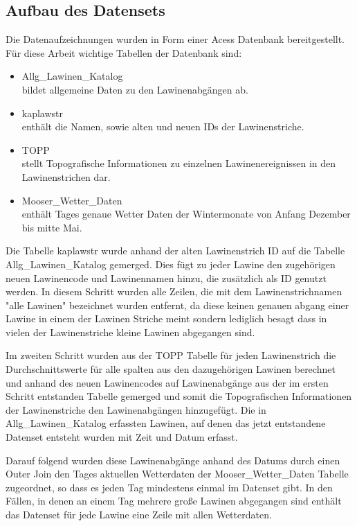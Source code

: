 \documentclass[12pt,a4paper]{article}
\begin{document}
 
\subsection{Aufbau des Datensets}
Die Datenaufzeichnungen wurden in Form einer Acess Datenbank bereitgestellt. 
Für diese Arbeit wichtige Tabellen der Datenbank sind:
\begin{itemize}
	\item Allg\_Lawinen\_Katalog \hfill \\ bildet allgemeine Daten zu den Lawinenabgängen ab.
	\item kaplawstr \hfill \\ enthält die Namen, sowie alten und neuen IDs der Lawinenstriche.
	\item TOPP \hfill \\ stellt Topografische Informationen zu einzelnen Lawinenereignissen in den Lawinenstrichen dar.
	\item Mooser\_Wetter\_Daten \hfill \\ enthält Tages genaue Wetter Daten der Wintermonate von Anfang Dezember bis mitte Mai.
\end{itemize}
	


Die Tabelle kaplawstr wurde anhand der alten Lawinenstrich ID auf die Tabelle Allg\_Lawinen\_Katalog gemerged. Dies fügt zu jeder Lawine den zugehörigen neuen Lawinencode und Lawinennamen hinzu, die zusätzlich als ID genutzt werden. In diesem Schritt wurden alle Zeilen, die mit dem Lawinenstrichnamen "alle Lawinen" bezeichnet wurden entfernt, da diese keinen genauen abgang einer Lawine in einem der Lawinen Striche meint sondern lediglich besagt dass in vielen der Lawinenstriche kleine Lawinen abgegangen sind. 

Im zweiten Schritt wurden aus der TOPP Tabelle für jeden Lawinenstrich die Durchschnittswerte für alle spalten aus den dazugehörigen Lawinen berechnet und anhand des neuen Lawinencodes auf Lawinenabgänge aus der im ersten Schritt entstanden Tabelle gemerged und somit die Topografischen Informationen der Lawinenstriche den Lawinenabgängen hinzugefügt. Die in Allg\_Lawinen\_Katalog erfassten Lawinen, auf denen das jetzt entstandene Datenset entsteht wurden mit Zeit und Datum erfasst.

Darauf folgend wurden diese Lawinenabgänge anhand des Datums durch einen Outer Join den Tages aktuellen Wetterdaten der Mooser\_Wetter\_Daten Tabelle zugeordnet, so dass es jeden Tag mindestens einmal im Datenset gibt. In den Fällen, in denen an einem Tag mehrere große Lawinen abgegangen sind enthält das Datenset für jede Lawine eine Zeile mit allen Wetterdaten. 
\end{document}
